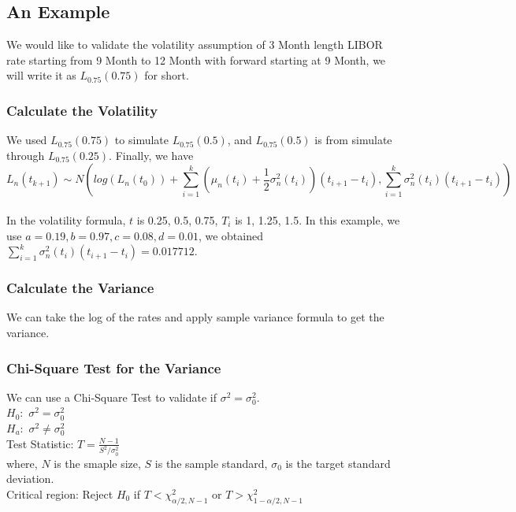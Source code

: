 \documentclass[12pt]{article}
\begin{document}
\subsection{An Example}
We would like to validate the volatility assumption of 3 Month length LIBOR rate starting from 9 Month to 12 Month with forward starting at 9 Month,
we will write it as $L_{0.75}(0.75)$ for short.

\subsubsection{Calculate the Volatility}
We used $L_{0.75}(0.75)$ to simulate $L_{0.75}(0.5)$, and $L_{0.75}(0.5)$ is from simulate through $L_{0.75}(0.25)$. Finally, we have 
\begin{equation}
    L_n(t_{k+1})\sim N\left( log(L_n(t_{0}))+\sum^k_{i=1}(\mu_n(t_i)+\frac{1}{2}\sigma^2_n(t_i))(t_{i+1}-t_i),
    \sum^k_{i=1} \sigma^2_n(t_i) (t_{i+1}-t_i)        \right)
\end{equation}
\\
In the volatility formula, $t$ is 0.25, 0.5, 0.75, $T_i$ is 1, 1.25, 1.5. In this example, we use $a = 0.19, b = 0.97, c = 0.08, d = 0.01$, we obtained  
$\sum^k_{i=1}\sigma^2_n(t_i) (t_{i+1}-t_i) = 0.017712$.

\subsubsection{Calculate the Variance}
We can take the log of the rates and apply sample variance formula to get the variance.

\subsubsection{Chi-Square Test for the Variance}
We can use a Chi-Square Test to validate if $\sigma^2 = \sigma^2_0$.
\\
$H_0:$
$
\sigma^2 = \sigma^2_0
$
\\
$H_a:$
$
\sigma^2 \neq \sigma^2_0
$
\\
Test Statistic:
$
T = \frac{N-1}{S^2/\sigma_0^2}
$
\\
where, $N$ is the smaple size, $S$ is the sample standard, $\sigma_0$ is the target standard deviation.
\\
Critical region: Reject $H_0$ if $T < \chi^2_{\alpha/2,N-1}$ or $T > \chi^2_{1-\alpha/2,N-1}$
\end{document}
